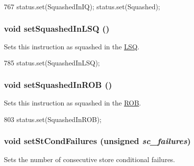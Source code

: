 \begin{DoxyCode}
767 { status.set(SquashedInIQ); status.set(Squashed);}
\end{DoxyCode}
\hypertarget{classBaseDynInst_a1d30846da1d1b390304ec1092751c8e0}{
\subsubsection[{setSquashedInLSQ}]{\setlength{\rightskip}{0pt plus 5cm}void setSquashedInLSQ ()}}
\label{classBaseDynInst_a1d30846da1d1b390304ec1092751c8e0}
Sets this instruction as squashed in the \hyperlink{classLSQ}{LSQ}. 


\begin{DoxyCode}
785 { status.set(SquashedInLSQ);}
\end{DoxyCode}
\hypertarget{classBaseDynInst_a27471486b9fc6c5983f728e15c3dd6c9}{
\subsubsection[{setSquashedInROB}]{\setlength{\rightskip}{0pt plus 5cm}void setSquashedInROB ()}}
\label{classBaseDynInst_a27471486b9fc6c5983f728e15c3dd6c9}
Sets this instruction as squashed in the \hyperlink{classROB}{ROB}. 


\begin{DoxyCode}
803 { status.set(SquashedInROB); }
\end{DoxyCode}
\hypertarget{classBaseDynInst_abbe779fa43c72cd485ddb736ab17ff61}{
\subsubsection[{setStCondFailures}]{\setlength{\rightskip}{0pt plus 5cm}void setStCondFailures (unsigned {\em sc\_\-failures})}}
\label{classBaseDynInst_abbe779fa43c72cd485ddb736ab17ff61}
Sets the number of consecutive store conditional failures. 



